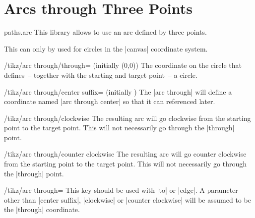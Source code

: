 %
%
%

\section{Arcs through Three Points}
\label{library:paths.arc}
\begin{tikzlibrary}{paths.arc}
  This library allows to use an arc defined by three points.
\end{tikzlibrary}

\begin{codeexample}[width=10cm,preamble=\usetikzlibrary{paths.arc}]
\end{codeexample}

This can only by used for circles in the |canvas| coordinate system.

\begin{key}{/tikz/arc through/through= (initially {(0,0)})}
  The coordinate on the circle that defines~-- together with the
  starting and target point~-- a circle.
\end{key}

\begin{key}{/tikz/arc through/center suffix= (initially {})}
  The |arc through| will define a coordinate named |arc through center|
  so that it can referenced later.
\end{key}

\begin{key}{/tikz/arc through/clockwise}
  The resulting arc will go clockwise from the starting point to the target point.
  This will not necessarily go through the |through| point.
\end{key}

\begin{key}{/tikz/arc through/counter clockwise}
  The resulting arc will go counter clockwise from the starting point to the target point.
  This will not necessarily go through the |through| point.
\end{key}

\begin{key}{/tikz/arc through=}
  This key should be used with |to| or |edge|.
  A parameter other than |center suffix|, |clockwise| or |counter clockwise| will
  be assumed to be the |through| coordinate.
\end{key}